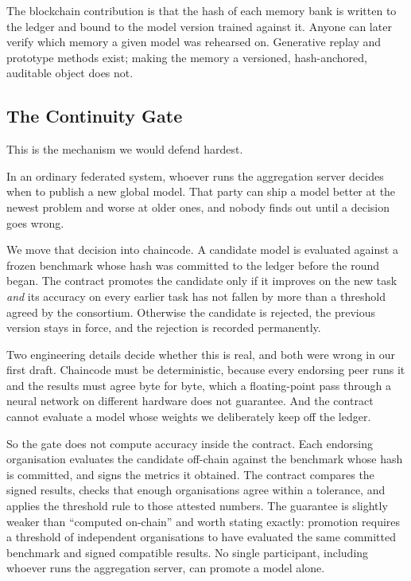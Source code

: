\documentclass[11pt,a4paper]{article}
\begin{document}
The blockchain contribution is that the hash of each memory bank is written to
the ledger and bound to the model version trained against it. Anyone can later
verify which memory a given model was rehearsed on. Generative replay
\citep{shin2017dgr} and prototype methods \citep{rebuffi2017icarl} exist; making
the memory a versioned, hash-anchored, auditable object does not.

\subsection{The Continuity Gate}

This is the mechanism we would defend hardest.

In an ordinary federated system, whoever runs the aggregation server decides
when to publish a new global model. That party can ship a model better at the
newest problem and worse at older ones, and nobody finds out until a decision
goes wrong.

We move that decision into chaincode. A candidate model is evaluated against a
frozen benchmark whose hash was committed to the ledger before the round began.
The contract promotes the candidate only if it improves on the new task
\emph{and} its accuracy on every earlier task has not fallen by more than a
threshold agreed by the consortium. Otherwise the candidate is rejected, the
previous version stays in force, and the rejection is recorded permanently.

Two engineering details decide whether this is real, and both were wrong in our
first draft. Chaincode must be deterministic, because every endorsing peer runs
it and the results must agree byte for byte, which a floating-point pass through
a neural network on different hardware does not guarantee. And the contract
cannot evaluate a model whose weights we deliberately keep off the ledger.

So the gate does not compute accuracy inside the contract. Each endorsing
organisation evaluates the candidate off-chain against the benchmark whose hash
is committed, and signs the metrics it obtained. The contract compares the
signed results, checks that enough organisations agree within a tolerance, and
applies the threshold rule to those attested numbers. The guarantee is slightly
weaker than ``computed on-chain'' and worth stating exactly: promotion requires
a threshold of independent organisations to have evaluated the same committed
benchmark and signed compatible results. No single participant, including
whoever runs the aggregation server, can promote a model alone.
\end{document}
